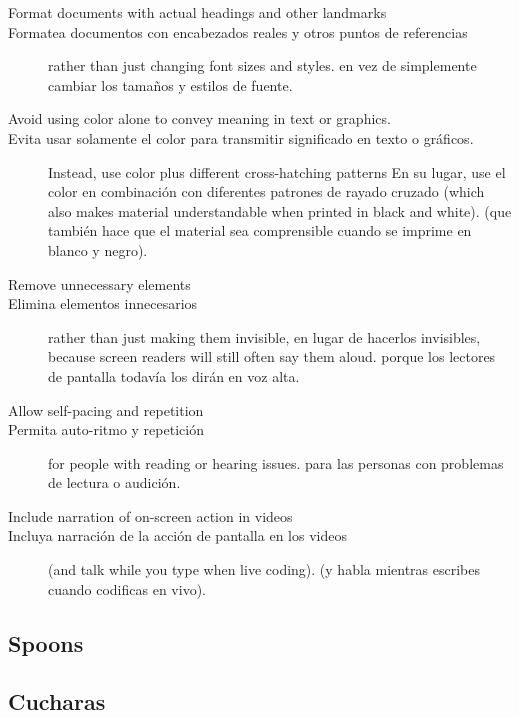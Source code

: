 \begin{description}

\item[Format documents with actual headings and other landmarks]
\item[Formatea documentos con encabezados reales y otros puntos de referencias]
  rather than just changing font sizes and styles.
  en vez de simplemente cambiar los tamaños y estilos de fuente.

\item[Avoid using color alone to convey meaning in text or graphics.]
\item[Evita usar solamente el color para transmitir significado en texto o gráficos.]
  Instead, use color plus different cross-hatching patterns
  En su lugar, use el color en combinación con diferentes patrones de rayado cruzado
  (which also makes material understandable when printed in black and white).
  (que también hace que el material sea comprensible cuando se imprime en blanco y negro).

\item[Remove unnecessary elements]
\item[Elimina elementos innecesarios]
  rather than just making them invisible,
  en lugar de hacerlos invisibles,
  because screen readers will still often say them aloud.
  porque los lectores de pantalla todavía los dirán en voz alta.

\item[Allow self-pacing and repetition]
\item[Permita auto-ritmo y repetición]
  for people with reading or hearing issues.
  para las personas con problemas de lectura o audición.

\item[Include narration of on-screen action in videos]
\item[Incluya narración de la acción de pantalla en los videos]
  (and talk while you type when live coding).
  (y habla mientras escribes cuando codificas en vivo).

\end{description}

\subsection*{Spoons}
\subsection*{Cucharas}


